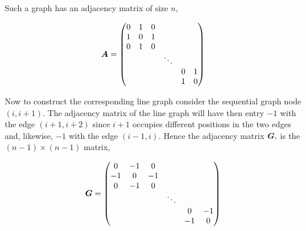 \begin{figure}[H]
    \centering
    
\end{figure}

Such a graph has an adjacency matrix of size $n$,

\begin{equation}
    \bm{A} =
    \begin{pmatrix}
        {0} & {1} & {0} & {}       & {}  & {}  \\
        {1} & {0} & {1} & {}       & {}  & {}  \\
        {0} & {1} & {0} & {}       & {}  & {}  \\
        {}  & {}  & {}  & {\ddots} & {}  & {}  \\
        {}  & {}  & {}  & {}       & {0} & {1} \\
        {}  & {}  & {}  & {}       & {1} & {0}
    \end{pmatrix}
\end{equation}

Now to construct the corresponding line graph consider the sequential graph node $(i, i+1)$. The adjacency matrix of the line graph will have then entry $-1$ with the edge $(i+1, i+2)$ since $i+1$ occupies different positions in the two edges and, likewise, $-1$ with the edge $(i-1, i)$. Hence the adjacency matrix $\bm{G},$ is the $(n-1) \times (n-1)$ matrix,

\begin{equation}
    \bm{G} =
    \begin{pmatrix}
        {0}  & {-1} & {0}  & {}       & {}   & {}   \\
        {-1} & {0}  & {-1} & {}       & {}   & {}   \\
        {0}  & {-1} & {0}  & {}       & {}   & {}   \\
        {}   & {}   & {}   & {\ddots} & {}   & {}   \\
        {}   & {}   & {}   & {}       & {0}  & {-1} \\
        {}   & {}   & {}   & {}       & {-1} & {0}
    \end{pmatrix}
\end{equation}

\begin{figure}[H]
    \centering
    
\end{figure}